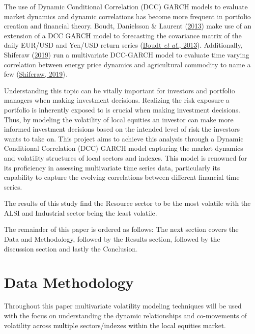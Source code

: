 \documentclass[12pt,preprint, authoryear]{elsarticle}
\numberwithin{equation}{section}
\numberwithin{figure}{section}
\numberwithin{table}{section}
\begin{document}
The use of Dynamic Conditional Correlation (DCC) GARCH models to
evaluate market dynamics and dynamic correlations has become more
frequent in portfolio creation and financial theory. Boudt, Danielsson
\& Laurent (\protect\hyperlink{ref-boudt2013robust}{2013}) make use of
an extension of a DCC GARCH model to forecasting the covariance matrix
of the daily EUR/USD and Yen/USD return series
(\protect\hyperlink{ref-boudt2013robust}{Boudt \emph{et al.}, 2013}).
Additionally, Shiferaw (\protect\hyperlink{ref-shiferaw2019time}{2019})
run a multivariate DCC-GARCH model to evaluate time varying correlation
between energy price dynamics and agricultural commodity to name a few
(\protect\hyperlink{ref-shiferaw2019time}{Shiferaw, 2019}).

Understanding this topic can be vitally important for investors and
portfolio managers when making investment decisions. Realizing the risk
exposure a portfolio is inherently exposed to is crucial when making
investment decisions. Thus, by modeling the volatility of local equities
an investor can make more informed investment decisions based on the
intended level of risk the investors wants to take on. This project aims
to achieve this analysis through a Dynamic Conditional Correlation (DCC)
GARCH model capturing the market dynamics and volatility structures of
local sectors and indexes. This model is renowned for its proficiency in
assessing multivariate time series data, particularly its capability to
capture the evolving correlations between different financial time
series.

The results of this study find the Resource sector to be the most
volatile with the ALSI and Industrial sector being the least volatile.

The remainder of this paper is ordered as follows: The next section
covers the Data and Methodology, followed by the Results section,
followed by the discussion section and lastly the Conclusion.

\hypertarget{data-methodology}{%
\section{\texorpdfstring{Data Methodology
\label{Data Methodology}}{Data Methodology }}\label{data-methodology}}

Throughout this paper multivariate volatility modeling techniques will
be used with the focus on understanding the dynamic relationships and
co-movements of volatility across multiple sectors/indexes within the
local equities market.
\end{document}
